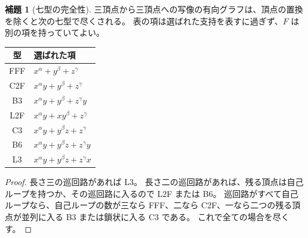 \documentclass[11pt,a4paper]{ltjsarticle}
\numberwithin{equation}{section}
\theoremstyle{definition}
\newtheorem{lemma}[theorem]{補題}
\begin{document}
\begin{lemma}[七型の完全性]\label{lem:seven}
三頂点から三頂点への写像の有向グラフは、頂点の置換を除くと次の七型で尽くされる。
表の項は選ばれた支持を表すに過ぎず、$F$ は別の項を持っていてよい。
\begin{center}\small
\begin{tabular}{cl}
\toprule
型 & 選ばれた項\\\midrule
FFF & $x^\alpha+y^\beta+z^\gamma$\\
C2F & $x^\alpha y+y^\beta+z^\gamma$\\
B3 & $x^\alpha y+y^\beta+z^\gamma y$\\
L2F & $x^\alpha y+xy^\beta+z^\gamma$\\
C3 & $x^\alpha y+y^\beta z+z^\gamma$\\
B6 & $x^\alpha y+y^\beta z+z^\gamma y$\\
L3 & $x^\alpha y+y^\beta z+z^\gamma x$\\\bottomrule
\end{tabular}
\end{center}
\end{lemma}
\begin{proof}
長さ三の巡回路があれば L3。
長さ二の巡回路があれば、残る頂点は自己ループを持つか、その巡回路に入るので L2F または B6。
巡回路がすべて自己ループなら、自己ループの数が三なら FFF、二なら C2F、一なら二つの残る頂点が並列に入る B3 または鎖状に入る C3 である。
これで全ての場合を尽くす。
\end{proof}
\end{document}
